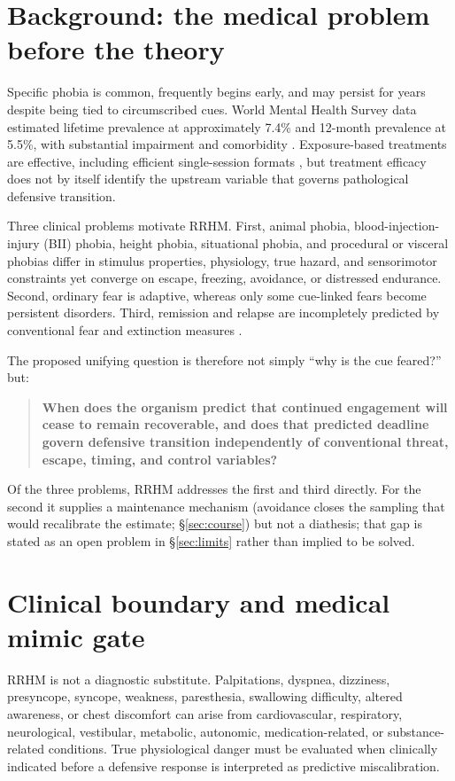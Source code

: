 \documentclass[9pt,twocolumn]{article}
\begin{document}
\section{Background: the medical problem before the theory}
Specific phobia is common, frequently begins early, and may persist for years despite being tied to circumscribed cues. World Mental Health Survey data estimated lifetime prevalence at approximately 7.4\% and 12-month prevalence at 5.5\%, with substantial impairment and comorbidity \cite{wardenaar2017,wardenaar2018corr}. Exposure-based treatments are effective, including efficient single-session formats \cite{odgers2022}, but treatment efficacy does not by itself identify the upstream variable that governs pathological defensive transition.

Three clinical problems motivate RRHM. First, animal phobia, blood-injection-injury (BII) phobia, height phobia, situational phobia, and procedural or visceral phobias differ in stimulus properties, physiology, true hazard, and sensorimotor constraints yet converge on escape, freezing, avoidance, or distressed endurance. Second, ordinary fear is adaptive, whereas only some cue-linked fears become persistent disorders. Third, remission and relapse are incompletely predicted by conventional fear and extinction measures \cite{trumpf2009remission,devos2025,bohnlein2020}.

The proposed unifying question is therefore not simply ``why is the cue feared?'' but:
\begin{quote}
\textbf{When does the organism predict that continued engagement will cease to remain recoverable, and does that predicted deadline govern defensive transition independently of conventional threat, escape, timing, and control variables?}
\end{quote}
Of the three problems, RRHM addresses the first and third directly. For the second it supplies a maintenance mechanism (avoidance closes the sampling that would recalibrate the estimate; \S\ref{sec:course}) but not a diathesis; that gap is stated as an open problem in \S\ref{sec:limits} rather than implied to be solved.

\section{Clinical boundary and medical mimic gate}
RRHM is not a diagnostic substitute. Palpitations, dyspnea, dizziness, presyncope, syncope, weakness, paresthesia, swallowing difficulty, altered awareness, or chest discomfort can arise from cardiovascular, respiratory, neurological, vestibular, metabolic, autonomic, medication-related, or substance-related conditions. True physiological danger must be evaluated when clinically indicated before a defensive response is interpreted as predictive miscalibration.
\end{document}
